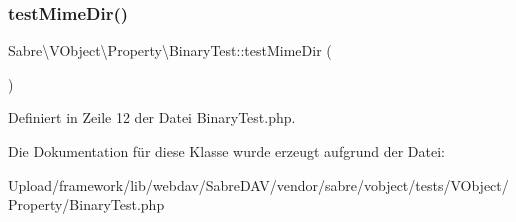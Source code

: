 \subsubsection{\texorpdfstring{test\+Mime\+Dir()}{testMimeDir()}}
{\footnotesize\ttfamily Sabre\textbackslash{}\+V\+Object\textbackslash{}\+Property\textbackslash{}\+Binary\+Test\+::test\+Mime\+Dir (\begin{DoxyParamCaption}{ }\end{DoxyParamCaption})}



Definiert in Zeile 12 der Datei Binary\+Test.\+php.



Die Dokumentation für diese Klasse wurde erzeugt aufgrund der Datei\+:\begin{DoxyCompactItemize}
\item 
Upload/framework/lib/webdav/\+Sabre\+D\+A\+V/vendor/sabre/vobject/tests/\+V\+Object/\+Property/Binary\+Test.\+php\end{DoxyCompactItemize}
